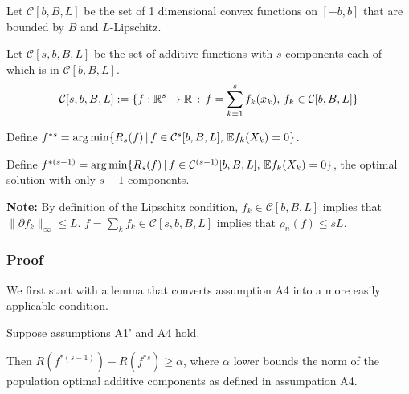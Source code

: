 Let $\mathcal{C}[b,B,L]$ be the set of 1 dimensional convex functions on $[-b,b]$ that are bounded by $B$ and $L$-Lipschitz.

Let $\mathcal{C}[s,b,B,L]$ be the set of additive functions with $s$ components each of which is in $\mathcal{C}[b,B,L]$. 
\[
\mathcal{C}[s,b,B,L] := \{ f : {\mathbb R}^s \rightarrow {\mathbb R} \,:\, f = \sum_{k=1}^s f_k(x_k), \, f_k \in \mathcal{C}[b,B,L] \}
\]
 
Define $f^{*s} = \arg\min \{ R_s(f) \,|\, f \in \mathcal{C}^s[b,B,L], \, {\mathbb E} f_k(X_k) = 0\}$.

Define $f^{*(s-1)} = \arg\min \{ R_s(f) \,|\, f \in \mathcal{C}^{(s-1)}[b,B,L], \, {\mathbb E} f_k(X_k) = 0\}$, the optimal solution with only $s-1$ components.

\textbf{Note:} By definition of the Lipschitz condition, $f_k \in \mathcal{C}[b,B,L]$ implies that $\| \partial f_k \|_\infty \leq L$. $f = \sum_k f_k \in \mathcal{C}[s,b,B,L]$ implies that $\rho_n(f) \leq sL$.

\subsubsection{Proof}
\label{sec:false_negative_proof_proof}

We first start with a lemma that converts assumption A4 into a more easily applicable condition.
\begin{lemma}
\label{lem:minus_one_risk_increase}
Suppose assumptions A1' and A4 hold. 

Then $R(f^{*(s-1)}) - R(f^{*s}) \geq \alpha$, where $\alpha$ lower bounds the norm of the population optimal additive components as defined in assumpation A4.
\end{lemma}

